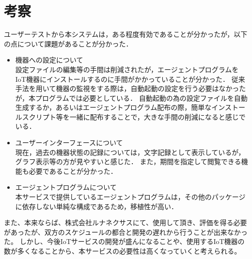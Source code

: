 \section{考察}
ユーザーテストから本システムは，ある程度有効であることが分かったが，以下の点について課題があることが分かった．
\begin{itemize}
\item 機器への設定について\\
	設定ファイルの編集等の手間は削減されたが，エージェントプログラムをIoT機器にインストールするのに手間がかかっていることが分かった．
	従来手法を用いて機器の監視をする際は，自動起動の設定を行う必要はなかったが，本プログラムでは必要としている．
	自動起動の為の設定ファイルを自動生成するか，あるいはエージェントプログラム配布の際，簡単なインストールスクリプト等を一緒に配布することで，大きな手間の削減になると感じでいる．
\item ユーザーインターフェースについて\\
	現在，過去の機器状態の記録については，文字記録として表示しているが，グラフ表示等の方が見やすいと感じた．
	また，期間を指定して閲覧できる機能も必要であることが分かった．
\item エージェントプログラムについて\\
	本サービスで提供しているエージェントプログラムは，その他のパッケージに依存しない単純な構成であるため，移植性が高い．
\end{itemize}
また、本来ならば、株式会社ルナネクサスにて、使用して頂き、評価を得る必要があったが、双方のスケジュールの都合と開発の遅れから行うことが出来なかった。
しかし、今後IoTサービスの開発が盛んになることや、使用するIoT機器の数が多くなることから、本サービスの必要性は高くなっていくと考えられる。



